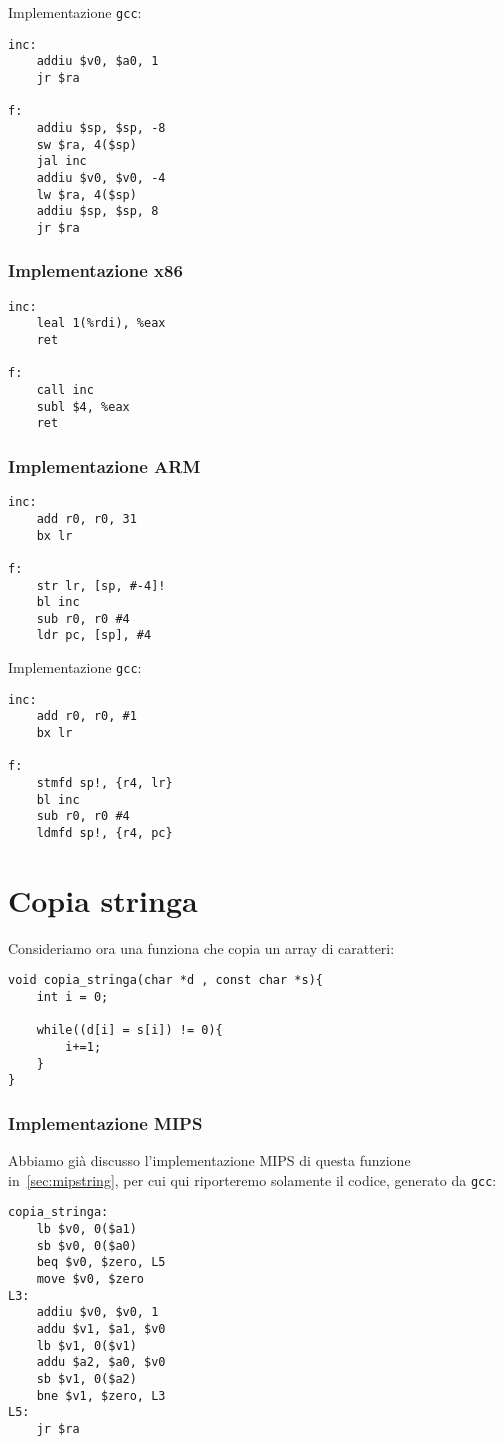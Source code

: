 \documentclass[class=book, crop=false, oneside]{standalone}
\begin{document}
Implementazione \texttt{gcc}:
\begin{verbatim}
inc:
	addiu $v0, $a0, 1
	jr $ra

f:
	addiu $sp, $sp, -8
	sw $ra, 4($sp)
	jal inc
	addiu $v0, $v0, -4
	lw $ra, 4($sp)
	addiu $sp, $sp, 8
	jr $ra
\end{verbatim}

\subsubsection{Implementazione x86}
\begin{verbatim}
inc:
	leal 1(%rdi), %eax
	ret

f:
	call inc
	subl $4, %eax
	ret
\end{verbatim}

\subsubsection{Implementazione ARM}
\begin{verbatim}
inc:
	add r0, r0, 31
	bx lr

f:
	str lr, [sp, #-4]!
	bl inc
	sub r0, r0 #4
	ldr pc, [sp], #4
\end{verbatim}

Implementazione \texttt{gcc}:
\begin{verbatim}
inc:
	add r0, r0, #1
	bx lr

f:
	stmfd sp!, {r4, lr}
	bl inc
	sub r0, r0 #4
	ldmfd sp!, {r4, pc}
\end{verbatim}

\section{Copia stringa}
Consideriamo ora una funziona che copia un array di caratteri:
\begin{verbatim}
void copia_stringa(char *d , const char *s){
	int i = 0;

	while((d[i] = s[i]) != 0){
		i+=1;
	}
}
\end{verbatim}

\subsubsection{Implementazione MIPS}
Abbiamo già discusso l'implementazione MIPS di questa funzione in~\ref{sec:mipstring}, per cui qui riporteremo solamente il codice, generato da \texttt{gcc}:
\begin{verbatim}
copia_stringa:
	lb $v0, 0($a1)
	sb $v0, 0($a0)
	beq $v0, $zero, L5
	move $v0, $zero
L3:
	addiu $v0, $v0, 1
	addu $v1, $a1, $v0
	lb $v1, 0($v1)
	addu $a2, $a0, $v0
	sb $v1, 0($a2)
	bne $v1, $zero, L3
L5:
	jr $ra
\end{verbatim}
\end{document}
